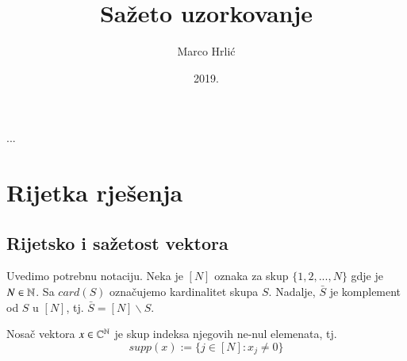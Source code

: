 \documentclass[a4paper,twoside,12pt]{memoir} %
\title{Sa\v{z}eto uzorkovanje}
\author{Marco Hrli\'c}
\date{2019.}  %
\begin{document}
\frontmatter


\begin{intro}
...
\end{intro}

\chapter[Rijetka rje\v{s}enja][Rjetka rje\v{s}enja]{Rijetka rje\v{s}enja}	

\section[Rijetsko i sa\v{z}etost vektora][Rijetsko i sa\v{z}etost vektora]{Rijetsko i sa\v{z}etost vektora}
Uvedimo potrebnu notaciju. Neka je $[N]$ oznaka za skup $\{1,2,...,N\}$ gdje je $N\in\mathbb{N}$. Sa $card(S)$ ozna\v{c}ujemo kardinalitet skupa $S$. Nadalje, $\bar{S}$ je komplement od $S$ u $[N]$, tj. $\bar{S}=[N]\backslash S$.

\begin{defn}
    Nosa\v{c} vektora $x \in \mathbb{C}^{\mathbb{N}}$ je skup indeksa njegovih ne-nul elemenata, tj.
    $$supp(x):=\{j\in[N]:x_j \neq 0 \}$$
\end{defn}
\end{document}
